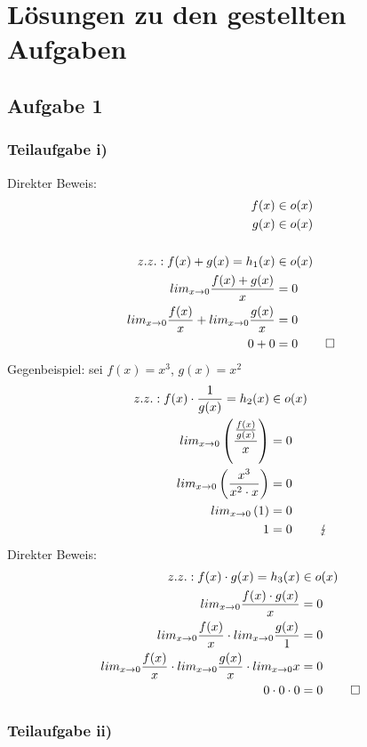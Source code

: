 \documentclass{llncs}
\begin{document}
\chapter*{L\"osungen zu den gestellten Aufgaben}

\section*{Aufgabe 1}

\subsection*{Teilaufgabe i)}

Direkter Beweis:
\begin{align*}
f(x) &\in o(x) \\
g(x) &\in o(x) \\
\\
z.z.: f(x) + g(x) = h_1(x) &\in o(x) \\
lim_{x \rightarrow 0} \frac{f(x) + g(x)}{x} &= 0 \\
lim_{x \rightarrow 0} \frac{f(x)}{x} + lim_{x \rightarrow 0} \frac{g(x)}{x} &= 0 \\
0 + 0 &= 0 &\hfill \square
\end{align*}
Gegenbeispiel: sei $f(x) = x^3$, $g(x) = x^2$
\begin{align*}
z.z.: f(x) \cdot \frac{1}{g(x)} = h_2(x) &\in o(x) \\lim_{x \rightarrow 0} \left( \dfrac{\frac{f(x)}{g(x)}}{x} \right) &= 0 \\
lim_{x \rightarrow 0} \left( \frac{x^3}{x^2 \cdot x} \right) &= 0 \\
lim_{x \rightarrow 0} \left( 1 \right) &= 0 \\
1 &= 0 &\hfill \lightning
\end{align*}
Direkter Beweis:
\begin{align*}
z.z.: f(x) \cdot g(x) = h_3(x) &\in o(x) \\
lim_{x \rightarrow 0} \frac{f(x) \cdot g(x)}{x} &= 0 \\
lim_{x \rightarrow 0} \frac{f(x)}{x} \cdot lim_{x \rightarrow 0} \frac{g(x)}{1} &= 0 \\
lim_{x \rightarrow 0} \frac{f(x)}{x} \cdot lim_{x \rightarrow 0} \frac{g(x)}{x} \cdot lim_{x \rightarrow 0} x &= 0 \\
0 \cdot 0 \cdot 0 &= 0 &\hfill \square
\end{align*}

\subsection*{Teilaufgabe ii)}
\end{document}

